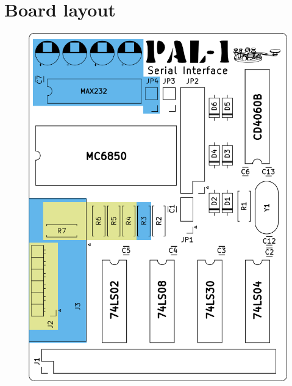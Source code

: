 \documentclass[a4paper,11pt,twoside,openright]{report}
\begin{document}


\chapter{Board layout}
\begin{figure}[h!]
\centering
\includegraphics[scale=2]{figures/serial-brd-1.0a.png}
\label{fig:layout}
\end{figure}





\end{document}
